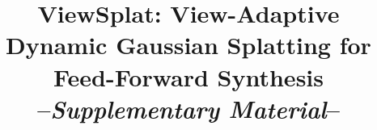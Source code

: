 \setlength{\textfloatsep}{10pt}
\setlength{\intextsep}{10pt}

\newcommand{\beginsupplement}{
	\setcounter{table}{0}
	\renewcommand{\thetable}{S\arabic{table}}%
	\setcounter{figure}{0}
	\renewcommand{\thefigure}{S\arabic{figure}}%
	\setcounter{equation}{0}
	\renewcommand{\theequation}{S\arabic{equation}}
}

% 

\title{ViewSplat: View-Adaptive Dynamic Gaussian Splatting for Feed-Forward Synthesis\\
--\textit{Supplementary Material}--}





\newpage



